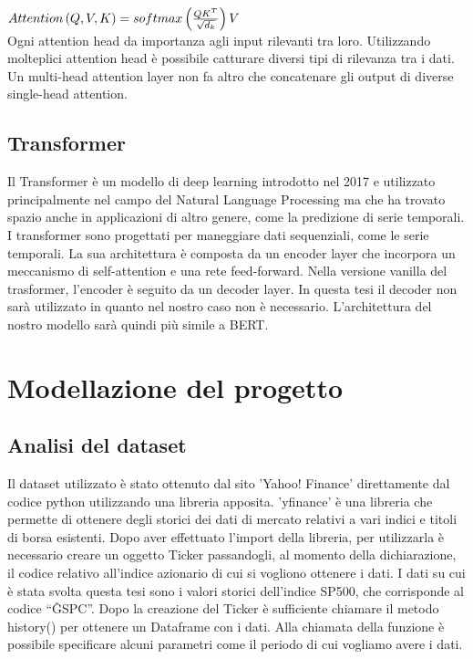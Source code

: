 \documentclass[12pt,a4paper,twoside,openright]{book}
\begin{document}
\begin{math}
\\
Attention\left ( Q,V,K \right ) = softmax\left ( \frac{QK^{T}}{\sqrt{d_{k}}} \right ) V
\end{math}
\\

Ogni attention head da importanza agli input rilevanti tra loro. Utilizzando molteplici attention head è possibile catturare diversi tipi di rilevanza tra i dati. Un multi-head attention layer non fa altro che concatenare gli output di diverse single-head attention.

\section{Transformer}

Il Transformer è un modello di deep learning introdotto nel 2017 e utilizzato principalmente nel campo del Natural Language Processing ma che ha trovato spazio anche in applicazioni di altro genere, come la predizione di serie temporali. I transformer sono progettati per maneggiare dati sequenziali, come le serie temporali.
La sua architettura è composta da un encoder layer che incorpora un meccanismo di self-attention\cite{DBLP:conf/emnlp/TangMRS18} e una rete feed-forward.
Nella versione vanilla del trasformer, l’encoder è seguito da un decoder layer. In questa tesi il decoder non sarà utilizzato in quanto nel nostro caso non è necessario. L’architettura del nostro modello sarà quindi più simile a BERT\cite{DBLP:journals/corr/abs-1810-04805}.
%
%
\chapter{Modellazione del progetto}
\section{Analisi del dataset}
Il dataset utilizzato è stato ottenuto dal sito 'Yahoo! Finance' direttamente dal codice python utilizzando una libreria apposita.
'yfinance' è una libreria che permette di ottenere degli storici dei dati di mercato relativi a vari indici e titoli di borsa esistenti.
Dopo aver effettuato l’import della libreria, per utilizzarla è necessario creare un oggetto Ticker passandogli, al momento della dichiarazione, il codice relativo all’indice azionario di cui si vogliono ottenere i dati.
I dati su cui è stata svolta questa tesi sono i valori storici dell’indice SP500, che corrisponde al codice “\^GSPC”.
Dopo la creazione del Ticker è sufficiente chiamare il metodo history() per ottenere un Dataframe con i dati. Alla chiamata della funzione è possibile specificare alcuni parametri come il periodo di cui vogliamo avere i dati.
\end{document}
